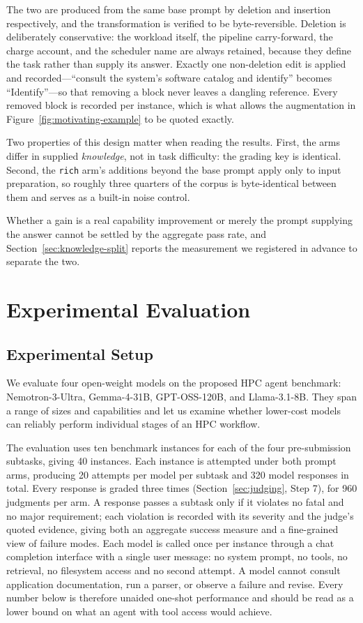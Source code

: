 \documentclass[conference]{IEEEtran}
\begin{document}
The two are produced from the same base prompt by deletion and insertion respectively, and the transformation is verified to be byte-reversible. Deletion is deliberately conservative: the workload itself, the pipeline carry-forward, the charge account, and the scheduler name are always retained, because they define the task rather than supply its answer. Exactly one non-deletion edit is applied and recorded---``consult the system's software catalog and identify'' becomes ``Identify''---so that removing a block never leaves a dangling reference. Every removed block is recorded per instance, which is what allows the augmentation in Figure~\ref{fig:motivating-example} to be quoted exactly.

Two properties of this design matter when reading the results. First, the arms differ in supplied \emph{knowledge}, not in task difficulty: the grading key is identical. Second, the \texttt{rich} arm's additions beyond the base prompt apply only to input preparation, so roughly three quarters of the corpus is byte-identical between them and serves as a built-in noise control.

Whether a gain is a real capability improvement or merely the prompt supplying the answer cannot be settled by the aggregate pass rate, and Section~\ref{sec:knowledge-split} reports the measurement we registered in advance to separate the two.

\section{Experimental Evaluation}
\label{sec:eval}
 
\subsection{Experimental Setup}
We evaluate four open-weight models on the proposed HPC agent benchmark: Nemotron-3-Ultra, Gemma-4-31B, GPT-OSS-120B, and Llama-3.1-8B. They span a range of sizes and capabilities and let us examine whether lower-cost models can reliably perform individual stages of an HPC workflow.

The evaluation uses ten benchmark instances for each of the four pre-submission subtasks, giving 40 instances. Each instance is attempted under both prompt arms, producing 20 attempts per model per subtask and 320 model responses in total. Every response is graded three times (Section~\ref{sec:judging}, Step 7), for 960 judgments per arm. A response passes a subtask only if it violates no fatal and no major requirement; each violation is recorded with its severity and the judge's quoted evidence, giving both an aggregate success measure and a fine-grained view of failure modes. Each model is called once per instance through a chat completion interface with a single user message: no system prompt, no tools, no retrieval, no filesystem access and no second attempt. A model cannot consult application documentation, run a parser, or observe a failure and revise. Every number below is therefore unaided one-shot performance and should be read as a lower bound on what an agent with tool access would achieve.
\end{document}
